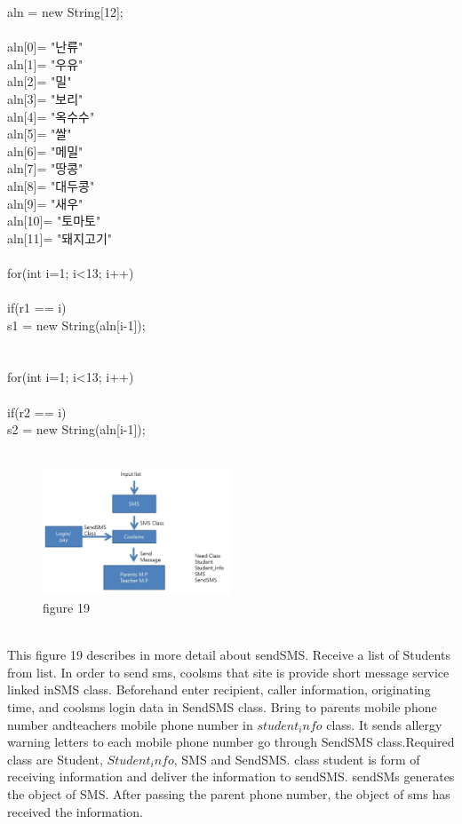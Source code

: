 \documentclass[a4paper,11pt]{IEEEtran}
\begin{document}
{{{aln = new String[12];\\
\\
aln[0]= "난류"\\
aln[1]= "우유"\\
aln[2]= "밀"\\
aln[3]= "보리"\\
aln[4]= "옥수수"\\
aln[5]= "쌀"\\
aln[6]= "메밀"\\
aln[7]= "땅콩"\\
aln[8]= "대두콩"\\
aln[9]= "새우"\\
aln[10]= "토마토"\\
aln[11]= "돼지고기"\\
\\
for(int i=1; i<13; i++)\\
{\\
if(r1 == i)\\
s1 = new String(aln[i-1]);\\
}\\
\\
for(int i=1; i<13; i++)\\
{\\
if(r2 == i)\\
s2 = new String(aln[i-1]);\\
}\\
\begin{figure}[!h]
        \centering
        \includegraphics[width=0.5\textwidth, height=0.5\textheight]{oa4.jpg}
        \caption{figure 19}
        \label{fig1}
\end{figure}
~\\
This figure 19 describes in more detail about sendSMS. Receive a list of Students from list. In order to send sms, coolsms that site is provide short message service linked inSMS class. Beforehand enter recipient, caller information, originating time, and coolsms login data in SendSMS class. Bring to parents mobile phone number andteachers mobile phone number in $student_info$ class. It sends allergy warning letters to each mobile phone number go through SendSMS class.Required class are Student, $Student_info$, SMS and SendSMS. class student is form of receiving information and deliver the information to sendSMS. sendSMs generates the object of SMS. After passing the parent phone number, the object of sms has received the information.
~\\
}}}
\end{document}
